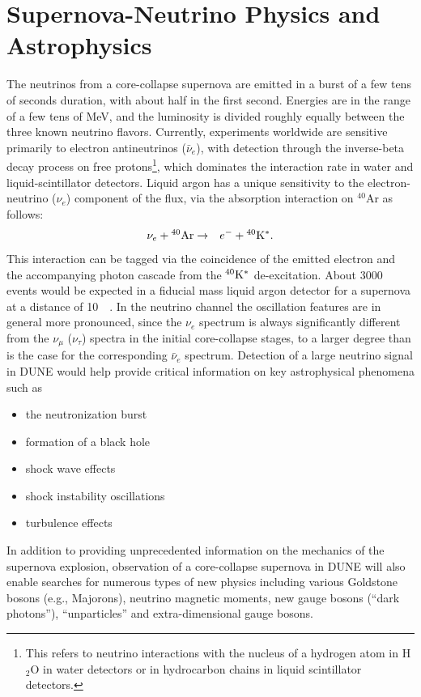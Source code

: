 \section{Supernova-Neutrino Physics and Astrophysics}

The neutrinos from a core-collapse supernova are emitted in a burst of
a few tens of seconds duration, with about half in the first
second. Energies are in the range of a few tens of MeV, and the
luminosity is divided roughly equally between the three known neutrino
flavors.  Currently, experiments worldwide are sensitive primarily to
electron antineutrinos ($\bar{\nu}_e$), with detection through the inverse-beta decay
process on free protons\footnote{This refers to neutrino interactions with the nucleus of a
hydrogen atom in H$_2$O in water detectors or in hydrocarbon chains in 
liquid scintillator detectors.},
 which dominates the interaction rate in water
and liquid-scintillator detectors.  Liquid argon has a unique sensitivity to
the electron-neutrino ($\nu_e$) component of the flux, via the absorption
interaction on $^{40}$Ar as follows:
\begin{eqnarray*}
\nu_e +{}^{40}{\rm Ar} & \rightarrow & e^-+{}^{40}{\rm K^*}.
\end{eqnarray*} 
This interaction can be tagged via the coincidence of the emitted
electron and the accompanying photon cascade from the $^{40}{\rm K^*}$
de-excitation.  About \num{3000} events would be expected in a 
fiducial mass liquid argon detector for a supernova at a distance of
\SI{10}{\kilo\parsec}.  In the neutrino channel the oscillation
features are in general more pronounced, since the $\nu_e$ spectrum is
always significantly different from the $\nu_\mu$ ($\nu_\tau$) spectra
in the initial core-collapse stages, to a larger degree than is the
case for the corresponding $\bar{\nu}_e$ spectrum.  Detection of a large
neutrino signal in DUNE would help provide critical information on key
astrophysical phenomena such as
\begin{itemize}
\item the neutronization burst
\item formation of a black hole
\item shock wave effects
\item shock instability oscillations
\item turbulence effects
\end{itemize}

In addition to providing unprecedented information on the mechanics of
the supernova explosion, observation of a core-collapse supernova in
DUNE will also enable searches for numerous types of new physics
including various Goldstone bosons (e.g., Majorons), neutrino magnetic
moments, new gauge bosons (``dark photons''), ``unparticles'' and
extra-dimensional gauge bosons.

